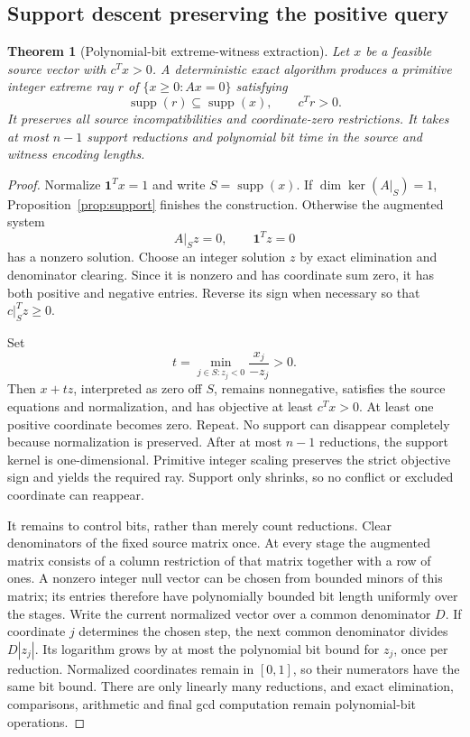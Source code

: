 \documentclass[11pt,a4paper]{article}
\newtheorem{theorem}{Theorem}[section]
\theoremstyle{definition}
\theoremstyle{remark}
\newcommand{\supp}{\operatorname{supp}}\newcommand{\rank}{\operatorname{rank}}
\newcommand{\one}{\mathbf1}\newcommand{\code}[1]{\texttt{\detokenize{#1}}}
\begin{document}
\subsection{Support descent preserving the positive query}
\begin{theorem}[Polynomial-bit extreme-witness extraction]
\label{thm:descent}
Let $x$ be a feasible source vector with $c^Tx>0$. A deterministic exact algorithm produces a primitive integer extreme ray $r$ of $\{x\ge0:Ax=0\}$ satisfying
\[
 \supp(r)\subseteq\supp(x),\qquad c^Tr>0.
\]
It preserves all source incompatibilities and coordinate-zero restrictions. It takes at most $n-1$ support reductions and polynomial bit time in the source and witness encoding lengths.
\end{theorem}
\begin{proof}
Normalize $\one^Tx=1$ and write $S=\supp(x)$. If $\dim\ker(A|_S)=1$, Proposition~\ref{prop:support} finishes the construction. Otherwise the augmented system
\[
 A|_S z=0,\qquad\one^Tz=0
\]
has a nonzero solution. Choose an integer solution $z$ by exact elimination and denominator clearing. Since it is nonzero and has coordinate sum zero, it has both positive and negative entries. Reverse its sign when necessary so that $c|_S^Tz\ge0$.

Set
\[
 t=\min_{j\in S:z_j<0}\frac{x_j}{-z_j}>0.
\]
Then $x+tz$, interpreted as zero off $S$, remains nonnegative, satisfies the source equations and normalization, and has objective at least $c^Tx>0$. At least one positive coordinate becomes zero. Repeat. No support can disappear completely because normalization is preserved. After at most $n-1$ reductions, the support kernel is one-dimensional. Primitive integer scaling preserves the strict objective sign and yields the required ray. Support only shrinks, so no conflict or excluded coordinate can reappear.

It remains to control bits, rather than merely count reductions. Clear denominators of the fixed source matrix once. At every stage the augmented matrix consists of a column restriction of that matrix together with a row of ones. A nonzero integer null vector can be chosen from bounded minors of this matrix; its entries therefore have polynomially bounded bit length uniformly over the stages. Write the current normalized vector over a common denominator $D$. If coordinate $j$ determines the chosen step, the next common denominator divides $D|z_j|$. Its logarithm grows by at most the polynomial bit bound for $z_j$, once per reduction. Normalized coordinates remain in $[0,1]$, so their numerators have the same bit bound. There are only linearly many reductions, and exact elimination, comparisons, arithmetic and final gcd computation remain polynomial-bit operations.
\end{proof}
\end{document}
